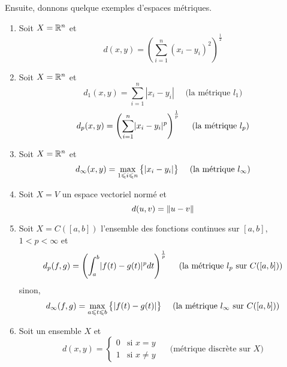 \documentclass[french]{article}
\begin{document}
Ensuite, donnons quelque exemples d'espaces métriques.
\begin{enumerate}
  \item Soit $X = \mathbb{R}^n$ et $$d(x, y) = \left( \sum_{i=1}^n (x_i - y_i)^2 \right)^\frac{1}{2}$$
  \item Soit $X = \mathbb{R}^n$ et $$d_1(x, y) = \sum_{i=1}^n |x_i - y_i| \quad\textrm{ (la métrique $l_1$)}$$
    $$d_p(x, y) = \left( \sum_{i=1}^n \lvert x_i - y_i\rvert^p \right)^\frac{1}{p} \quad\textrm{ (la métrique $l_p$)}$$
  \item Soit $X = \mathbb{R}^n$ et $$d_\infty(x, y) = \max_{1 \leqslant i \leqslant n} \big\{ \lvert x_i - y_i\rvert \big\} \quad\textrm{ (la métrique $l_\infty$)}$$
  \item Soit $X = V$ un espace vectoriel normé et $$d(u, v) = \lVert u - v\rVert$$
  \item Soit $X = C([a, b])$ l'ensemble des fonctions continues sur $[a, b]$, $1 < p < \infty$ et $$d_p(f, g) = \left( \int_a^b \lvert f(t) - g(t)\rvert^p dt\right)^\frac{1}{p} \quad\textrm{ (la métrique $l_p$ sur $C([a, b])$)} $$
    sinon,
    $$d_\infty(f, g) = \max_{a \leqslant t \leqslant b} \big\{ \lvert f(t) - g(t)\rvert \big\} \quad\textrm{ (la métrique $l_\infty$ sur $C([a, b])$)}$$
  \item Soit un ensemble $X$ et 
    $$ d(x, y) = \begin{cases}
      0 & \textrm{si } x = y \\
      1 & \textrm{si } x \neq y
    \end{cases} \quad\textrm{ (métrique discrète sur $X$)}$$
\end{enumerate}
\end{document}
